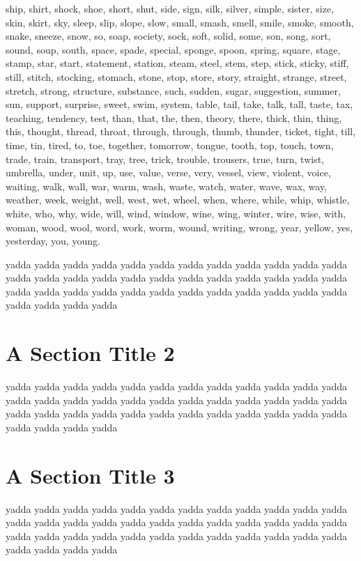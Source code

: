 ship, shirt, shock, shoe, short, shut, side, sign, silk, silver, simple,
sister, size, skin, skirt, sky, sleep, slip, slope, slow, small, smash, smell,
smile, smoke, smooth, snake, sneeze, snow, so, soap, society, sock, soft,
solid, some, son, song, sort, sound, soup, south, space, spade, special,
sponge, spoon, spring, square, stage, stamp, star, start, statement, station,
steam, steel, stem, step, stick, sticky, stiff, still, stitch, stocking,
stomach, stone, stop, store, story, straight, strange, street, stretch,
strong, structure, substance, such, sudden, sugar, suggestion, summer, sun,
support, surprise, sweet, swim, system, table, tail, take, talk, tall, taste,
tax, teaching, tendency, test, than, that, the, then, theory, there, thick,
thin, thing, this, thought, thread, throat, through, through, thumb, thunder,
ticket, tight, till, time, tin, tired, to, toe, together, tomorrow, tongue,
tooth, top, touch, town, trade, train, transport, tray, tree, trick, trouble,
trousers, true, turn, twist, umbrella, under, unit, up, use, value, verse,
very, vessel, view, violent, voice, waiting, walk, wall, war, warm, wash,
waste, watch, water, wave, wax, way, weather, week, weight, well, west, wet,
wheel, when, where, while, whip, whistle, white, who, why, wide, will, wind,
window, wine, wing, winter, wire, wise, with, woman, wood, wool, word, work,
worm, wound, writing, wrong, year, yellow, yes, yesterday, you, young.\par

yadda yadda yadda yadda yadda yadda yadda yadda yadda yadda
yadda yadda yadda yadda yadda yadda yadda yadda yadda yadda
yadda yadda yadda yadda yadda yadda yadda yadda yadda yadda
yadda yadda yadda yadda yadda yadda yadda yadda yadda yadda\par
\section{A Section Title 2 
}


yadda yadda yadda yadda yadda yadda yadda yadda yadda yadda
yadda yadda yadda yadda yadda yadda yadda yadda yadda yadda
yadda yadda yadda yadda yadda yadda yadda yadda yadda yadda
yadda yadda yadda yadda yadda yadda yadda yadda yadda yadda\par
\section{A Section Title 3 
}


yadda yadda yadda yadda yadda yadda yadda yadda yadda yadda
yadda yadda yadda yadda yadda yadda yadda yadda yadda yadda
yadda yadda yadda yadda yadda yadda yadda yadda yadda yadda
yadda yadda yadda yadda yadda yadda yadda yadda yadda yadda\par
